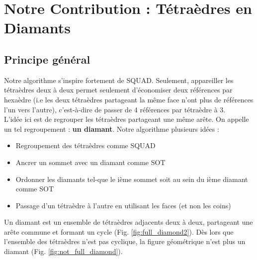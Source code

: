 \section{Notre Contribution : Tétraèdres en Diamants}
\subsection{Principe général}
\noindent
Notre algorithme s'inspire fortement de SQUAD. Seulement, appareiller les tétraèdres deux à deux permet seulement d'économiser deux références par hexaèdre (i.e les deux tétraèdres partageant la même face n'ont plus de références l'un vers l'autre), c'est-à-dire de passer de 4 références par tétraèdre à 3.\\
L'idée ici est de regrouper les tétraèdres partageant une même arête. On appelle un tel regroupement : \textbf{un diamant}. Notre algorithme plusieurs idées :
\begin{itemize}
\item Regroupement des tétraèdres comme SQUAD
\item Ancrer un sommet avec un diamant comme SOT
\item Ordonner les diamants tel-que le ième sommet soit au sein du ième diamant comme SOT
\item Passage d'un tétraèdre à l'autre en utilisant les faces (et non les coins)\\
\end{itemize}
Un diamant est un ensemble de tétraèdres adjacents deux à deux, partageant une arête commune et formant un cycle (Fig. \ref{fig:full_diamond2}). Dès lors que l'ensemble des tétraèdres n'est pas cyclique, la figure géométrique n'est plus un diamant (Fig. \ref{fig:not_full_diamond}).
